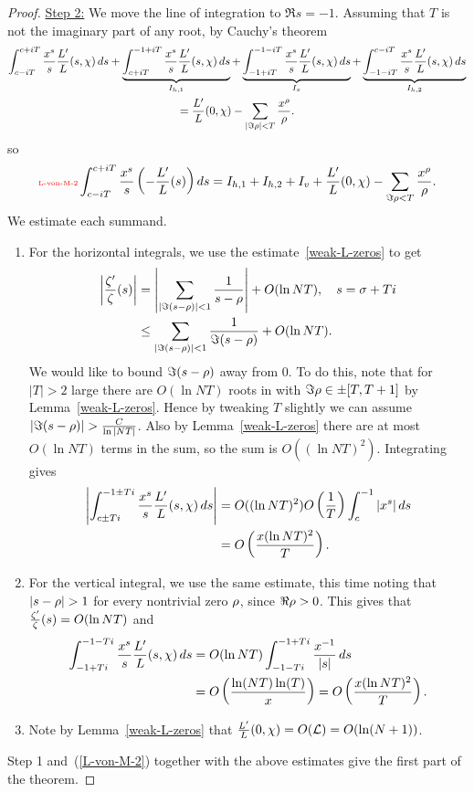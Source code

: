 \begin{proof}
\noindent\underline{Step 2:} We move the line of integration to $\Re s=-1$. Assuming that $T$ is not the imaginary part of any root, by Cauchy's theorem %
\begin{multline}
\int_{c-iT}^{c+iT} \frac{x^s}{s}\frac{L'}{L}(s,\chi)\,ds
+\underbrace{\int_{c+iT}^{-1+iT} \frac{x^s}{s}\frac{L'}{L}(s,\chi)\,ds}_{I_{h,1}}
+\underbrace{\int_{-1+iT}^{-1-iT} \frac{x^s}{s}\frac{L'}{L}(s,\chi)\,ds}_{I_{v}}
+\underbrace{\int_{-1-iT}^{c-iT} \frac{x^s}{s}\frac{L'}{L}(s,\chi)\,ds}_{I_{h,2}}\\
=\frac{L'}{L}(0,\chi)-\sum_{|\Im\rho|<T}\frac{x^{\rho}}{\rho}.
\end{multline}
so
\begin{equation}\llabel{L-von-M-2}
\int_{c-iT}^{c+iT} \frac{x^s}{s}\pa{-\frac{L'}{L}(s)}ds=I_{h,1}+I_{h,2}+I_v+\fc{L'}{L}(0,\chi)-\sum_{\Im\rh<T}\frac{x^{\rh}}{\rh}.
\end{equation}
We estimate each summand.
\begin{enumerate}
\item For the horizontal integrals, we use the estimate~\ref{weak-L-zeros} to get
\begin{align*}
\left| {\frac{\zeta'}{\zeta}(s)} \right|&=\left| {\sum_{|\Im(s-\rho)|<1} \frac{1}{s-\rho}} \right|+O(\ln NT),\quad s=\sigma+Ti\\
&\le \sum_{|\Im(s-\rho)|<1}\frac{1}{\Im(s-\rho)}+O(\ln NT).
\end{align*}
We would like to bound $\Im(s-\rho)$ away from 0. To do this, note that for $|T|>2$ large there are $O(\ln NT)$ roots in with $\Im \rho\in \pm[T,T+1]$ by Lemma~\ref{weak-L-zeros}. Hence by tweaking $T$ slightly we can assume $|\Im(s-\rh)|>\frac{C}{\ln|NT|}$. Also by Lemma~\ref{weak-L-zeros} there are at most $O(\ln NT)$ terms in the sum, so the sum is $O((\ln NT)^2)$. 
Integrating gives
\begin{align*}
\left| {\int_{c\pm Ti}^{-1\pm Ti} \frac{x^s}{s}\frac{L'}{L}(s,\chi)\,ds} \right|
&=O((\ln NT)^2)O\left( {\frac{1}{T}} \right)\int_{c}^{-1} |x^s|\,ds\\
&=O\left( {\frac{x(\ln NT)^2}{T}} \right).
\end{align*}
\item For the vertical integral, we use the same estimate, this time noting that $|s-\rh|>1$ for every nontrivial zero $\rho$, since $\Re \rho>0$. This gives that $\frac{\zeta'}{\zeta}(s)=O(\ln NT)$ and
\begin{align*}
\int_{-1+Ti}^{-1-Ti}
\frac{x^s}{s}\frac{L'}{L}(s,\chi)\,ds
&=
O(\ln NT)
\int_{-1-Ti}^{-1+Ti} \frac{x^{-1}}{|s|}\,ds
\\
&=
O\left( {\frac{\ln (NT)\ln(T)}{x}} \right)=O\left( {\frac{x(\ln NT)^2}{T}} \right).
\end{align*}
\item
Note by Lemma~\ref{weak-L-zeros} that $\frac{L'}{L}(0,\chi)=O(\mathcal{L})=O(\ln (N+1))$.
\end{enumerate}
Step 1 and~(\ref{L-von-M-2}) together with the above  estimates give the first part of the theorem.


\end{proof}
